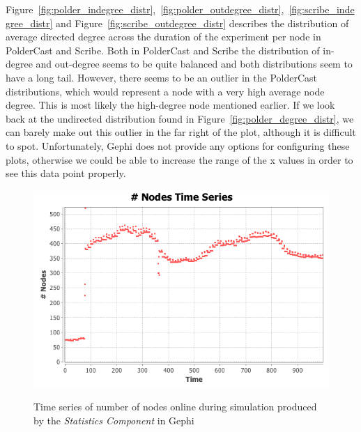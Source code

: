 Figure~\ref{fig:polder_indegree_distr},~\ref{fig:polder_outdegree_distr},~\ref{fig:scribe_indegree_distr}
and Figure~\ref{fig:scribe_outdegree_distr} describes the distribution
of average directed degree across the duration of the experiment per
node in PolderCast and Scribe. Both in PolderCast and Scribe the
distribution of in-degree and out-degree seems to be quite balanced and
both distributions seem to have a long tail. However, there seems to be
an outlier in the PolderCast distributions, which would represent a node
with a very high average node degree. This is most likely the
high-degree node mentioned earlier. If we look back at the undirected
distribution found in Figure~\ref{fig:polder_degree_distr}, we can
barely make out this outlier in the far right of the plot, although it
is difficult to spot.  Unfortunately, Gephi does not provide any options
for configuring these plots, otherwise we could be able to increase the
range of the x values in order to see this data point properly.

\begin{figure}[Ht]
    \centering
    \includegraphics[scale=0.5]{plots/polder_nodes_ts}
    \label{fig:polder_node_ts}
    \caption{Time series of number of nodes online during simulation
        produced by the \emph{Statistics Component} in Gephi}
\end{figure}


